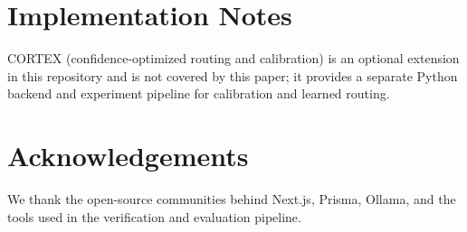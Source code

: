 \documentclass[10pt]{article}
\begin{document}
\section*{Implementation Notes}
CORTEX (confidence-optimized routing and calibration) is an optional extension in this repository and is not covered by this paper; it provides a separate Python backend and experiment pipeline for calibration and learned routing.

\section*{Acknowledgements}
We thank the open-source communities behind Next.js, Prisma, Ollama, and the tools used in the verification and evaluation pipeline.



\end{document}

